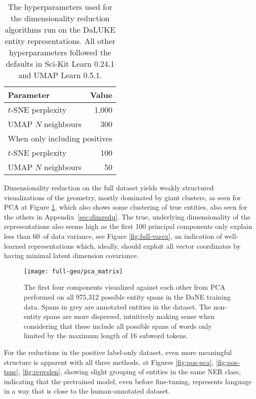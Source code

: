\documentclass[main.tex]{subfiles}
\begin{document}
\begin{table}[H]
    \centering
    \begin{tabular}{l|r}
        Parameter           &  Value\\\hline
        $t$-SNE perplexity  &  1,000   \\
        UMAP $N$ neighbours &  300\\\hline
        \multicolumn{2}{c}{When only including positives}\\\hline
        $t$-SNE perplexity  & 100\\
        UMAP $N$ neighbours & 50
    \end{tabular}
    \caption{
        The hyperparameters used for the dimensionality reduction algorithms run on the DaLUKE entity representations.
        All other hyperparameters followed the defaults in Sci-Kit Learn 0.24.1 and UMAP Learn 0.5.1.
    }\label{tab:dimreducer-hyper}
\end{table}\noindent
Dimensionality reduction on the full dataset yields weakly structured visualizations of the geometry, mostly dominated by giant clusters, as seen for PCA at Figure \ref{fig:all-pca}, which also shows some clustering of true entities, also seen for the others in Appendix~\ref{sec:dimredu}.
The true, underlying dimensionality of the representations also seems high as the first 100 principal components only explain less than 60\pro\ of data variance, see Figure \ref{fig:full-varex}, an indication of well-learned representations which, ideally, should exploit all vector coordinates by having minimal latent dimension covariance.

\begin{figure}[H]
    \centering
    \texttt{[image: full-geo/pca\_matrix]}
    \caption{
        The first four components visualized against each other from PCA performed on all 975,312 possible entity spans in the DaNE training data.
        Spans in grey are annotated entities in the dataset.
        The non-entity spans are more dispersed, intuitively making sense when considering that these include all possible spans of words only limited by the maximum length of 16 subword tokens.
    }
    \label{fig:all-pca}
\end{figure}\noindent
For the reductions in the positive label-only dataset, even more meaningful structure is apparent with all three methods, at Figures \ref{fig:pos-pca}, \ref{fig:pos-tsne}, \ref{fig:repvslen}, showing slight grouping of entities in the same NER class, indicating that the pretrained model, even before fine-tuning, represents language in a way that is close to the human-annotated dataset.
\end{document}
